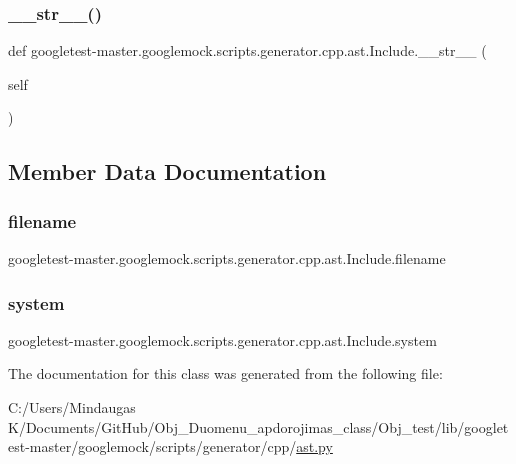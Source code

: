 \subsubsection{\texorpdfstring{\_\_str\_\_()}{\_\_str\_\_()}}
{\footnotesize\ttfamily def googletest-\/master.\+googlemock.\+scripts.\+generator.\+cpp.\+ast.\+Include.\+\_\+\+\_\+str\+\_\+\+\_\+ (\begin{DoxyParamCaption}\item[{}]{self }\end{DoxyParamCaption})}



\subsection{Member Data Documentation}
\mbox{\label{classgoogletest-master_1_1googlemock_1_1scripts_1_1generator_1_1cpp_1_1ast_1_1_include_a11a8287302b958e05447111d4f1cd744}} 
\subsubsection{\texorpdfstring{filename}{filename}}
{\footnotesize\ttfamily googletest-\/master.\+googlemock.\+scripts.\+generator.\+cpp.\+ast.\+Include.\+filename}

\mbox{\label{classgoogletest-master_1_1googlemock_1_1scripts_1_1generator_1_1cpp_1_1ast_1_1_include_a24d31dd181f9490be09c625afa3e4f05}} 
\subsubsection{\texorpdfstring{system}{system}}
{\footnotesize\ttfamily googletest-\/master.\+googlemock.\+scripts.\+generator.\+cpp.\+ast.\+Include.\+system}



The documentation for this class was generated from the following file\+:\begin{DoxyCompactItemize}
\item 
C\+:/\+Users/\+Mindaugas K/\+Documents/\+Git\+Hub/\+Obj\+\_\+\+Duomenu\+\_\+apdorojimas\+\_\+class/\+Obj\+\_\+test/lib/googletest-\/master/googlemock/scripts/generator/cpp/\mbox{\hyperlink{_obj__test_2lib_2googletest-master_2googlemock_2scripts_2generator_2cpp_2ast_8py}{ast.\+py}}\end{DoxyCompactItemize}
